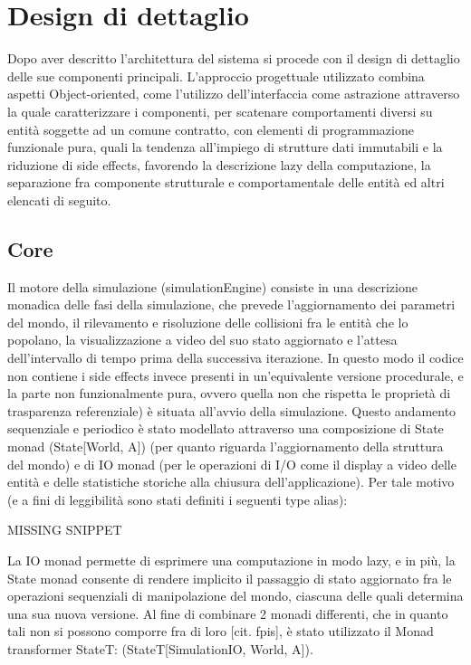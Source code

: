 \section{Design di dettaglio}

Dopo aver descritto l’architettura del sistema si procede con il design di dettaglio delle sue componenti principali. 
L’approccio progettuale utilizzato combina aspetti Object-oriented, come l’utilizzo dell’interfaccia come astrazione attraverso la quale caratterizzare i componenti, per scatenare comportamenti diversi su entità soggette ad un comune contratto, con elementi di programmazione funzionale pura, quali la tendenza all’impiego di strutture dati immutabili e la riduzione di side effects, favorendo la descrizione lazy della computazione, la separazione fra componente strutturale e comportamentale delle entità ed altri elencati di seguito.


\subsection{Core}
Il motore della simulazione (simulationEngine) consiste in una descrizione monadica delle fasi della simulazione, che prevede l’aggiornamento dei parametri del mondo, il rilevamento e risoluzione delle collisioni fra le entità che lo popolano, la visualizzazione a video del suo stato aggiornato e l’attesa dell’intervallo di tempo prima della successiva iterazione. In questo modo il codice non contiene i side effects invece presenti in un’equivalente versione procedurale, e la parte non funzionalmente pura, ovvero quella non che rispetta le proprietà di trasparenza referenziale) è situata all’avvio della simulazione. 
Questo andamento sequenziale e periodico è stato modellato attraverso una composizione di State monad  (State[World, A]) (per quanto riguarda l’aggiornamento della struttura del mondo) e di IO monad (per le operazioni di I/O come il display a video delle entità e delle statistiche storiche alla chiusura dell’applicazione). Per tale motivo (e a fini di leggibilità sono stati definiti i seguenti type alias):


MISSING SNIPPET

La IO monad permette di esprimere una computazione in modo lazy, e in più, la State monad consente di rendere implicito il passaggio di stato aggiornato fra le operazioni sequenziali di manipolazione del mondo, ciascuna delle quali determina una sua nuova versione. Al fine di combinare 2 monadi differenti, che in quanto tali non si possono comporre fra di loro [cit. fpis], è stato utilizzato il Monad transformer StateT: (StateT[SimulationIO, World, A]).

